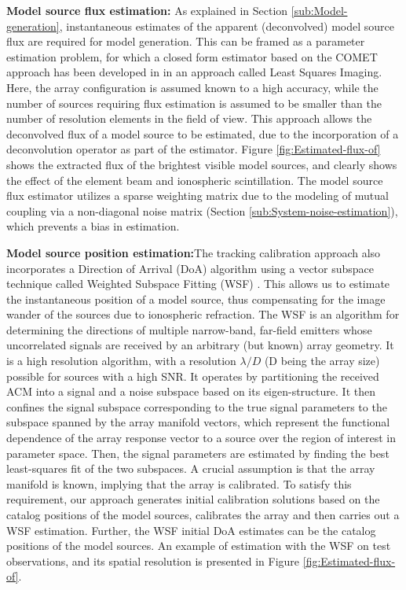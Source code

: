 \documentclass{aa}
\begin{document}
\textbf{Model    source   flux    estimation:}   As    explained    in   Section
\ref{sub:Model-generation},    instantaneous   estimates    of    the   apparent
(deconvolved) model source flux are  required for model generation.  This can be
framed  as a parameter  estimation problem,  for which  a closed  form estimator
based     on     the     COMET     approach    has     been     developed     in
\citep{wijnholds2008fundamental}  in an approach  called Least  Squares Imaging.
Here, the  array configuration is  assumed known to  a high accuracy,  while the
number of  sources requiring flux estimation  is assumed to be  smaller than the
number of  resolution elements in the  field of view.  This  approach allows the
deconvolved flux of a model source  to be estimated, due to the incorporation of
a    deconvolution    operator    as    part   of    the    estimator.    Figure
\ref{fig:Estimated-flux-of} shows  the extracted  flux of the  brightest visible
model sources, and clearly shows the  effect of the element beam and ionospheric
scintillation.   The model  source flux  estimator utilizes  a  sparse weighting
matrix due  to the modeling of  mutual coupling via a  non-diagonal noise matrix
(Section   \ref{sub:System-noise-estimation}),   which   prevents  a   bias   in
estimation.

\textbf{Model source position estimation:}The tracking calibration approach also
incorporates  a Direction  of Arrival  (DoA) algorithm  using a  vector subspace
technique           called          Weighted           Subspace          Fitting
(WSF) \citep{viberg1991detection}. This  allows us to  estimate the instantaneous
position  of a  model source,  thus compensating  for the  image wander  of the
sources due to  ionospheric refraction. The WSF is  an algorithm for determining
the directions  of multiple  narrow-band, far-field emitters  whose uncorrelated
signals are  received by an arbitrary (but  known) array geometry. It  is a high
resolution algorithm, with a  resolution $\lambda/D$ (D being the array
size) possible  for sources  with a  high SNR. It  operates by  partitioning the
received ACM  into a signal and  a noise subspace based  on its eigen-structure.
It then confines the signal subspace corresponding to the true signal parameters
to  the subspace  spanned by  the array  manifold vectors,  which  represent the
functional dependence of  the array response vector to a  source over the region
of interest  in parameter  space. Then, the  signal parameters are  estimated by
finding the best least-squares fit of the two subspaces. A crucial assumption is
that the  array manifold  is known,  implying that the  array is  calibrated. To
satisfy this  requirement, our approach generates  initial calibration solutions
based on  the catalog positions of  the model sources, calibrates  the array and
then carries out a WSF estimation. Further, the WSF initial DoA estimates can be
the catalog  positions of the model  sources. An example of  estimation with the
WSF  on test observations,  and its  spatial resolution  is presented  in Figure
\ref{fig:Estimated-flux-of}.
\end{document}
